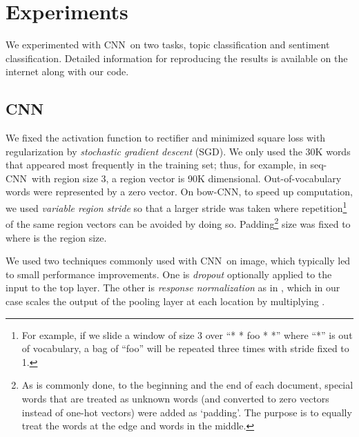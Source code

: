 \documentclass[11pt,letterpaper]{article}
\newcommand{\cnn}{CNN}
\newcommand{\scnn}{seq-CNN}
\newcommand{\bcnn}{bow-CNN}
\begin{document}
\section{Experiments}
\label{sec:experiment} 

We experimented with 
\cnn\ on two tasks, topic classification and sentiment classification. 
Detailed information for reproducing the results 
is available on the internet along with our code.  

\subsection{\cnn}


We fixed the activation function to 
rectifier {\small } and minimized square loss with  
regularization by 
{\em stochastic gradient descent} (SGD).  
We only used the 30K words that appeared most frequently in the training set; 
thus, for example, 
in \scnn\ with region size 3, a region vector is 90K dimensional.  
Out-of-vocabulary words were represented by a zero vector.  
On \bcnn, to speed up computation, 
we used {\em variable region stride} 
so that a larger stride was taken where repetition\footnote{
  For example, if we slide a window of size 3 over ``* * foo * *''
  where ``*'' is out of vocabulary, 
  a bag of ``foo'' will be repeated three times with stride fixed to 1.   
} 
of the same region vectors
can be avoided by doing so.  
Padding\footnote{
  As is commonly done, 
  to the beginning and the end of each document, special words that are treated as unknown words 
  (and converted to zero vectors instead of one-hot vectors) were added as `padding'.
  The purpose is to equally treat the words at the edge and words in the middle.  
}
size was fixed to  where  is the region size.  


We used two techniques commonly used with \cnn\ on image, which typically 
led to small performance improvements.  
One is {\em dropout} \cite{dropout12} optionally applied to the input to the top layer.  
The other is {\em response normalization} as in \cite{imagenetNips12}, 
which in our case scales the output of the pooling layer 
 at each location by multiplying .  
\end{document}
